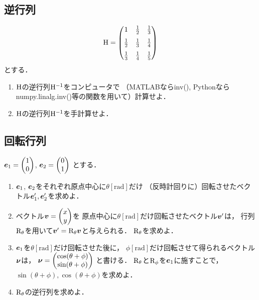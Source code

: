 \subsection{逆行列}
    \begin{equation}
      \mathrm{H} =
        \begin{pmatrix}
                     1 & \frac{1}{2} & \frac{1}{3} \\[1.5ex]
           \frac{1}{2} & \frac{1}{3} & \frac{1}{4} \\[1.5ex]
           \frac{1}{3} & \frac{1}{4} & \frac{1}{5}
        \end{pmatrix}
    \end{equation}
    とする．
    \begin{enumerate}[label=(\roman*)]
      \item $\mathrm{H}$の逆行列$\mathrm{H}^{-1}$をコンピュータで
        （MATLABならinv(), Pythonならnumpy.linalg.inv()等の関数を用いて）計算せよ．
        
      \item $\mathrm{H}$の逆行列$\mathrm{H}^{-1}$を手計算せよ．
    \end{enumerate}

\subsection{回転行列}
  $\boldsymbol{e}_1 = \begin{pmatrix} 1 \\ 0 \end{pmatrix}$,
  $\boldsymbol{e}_2 = \begin{pmatrix} 0 \\ 1 \end{pmatrix}$
  とする．
  \begin{enumerate}[label=(\roman*)]
    \item $\boldsymbol{e}_1$, $\boldsymbol{e}_2$をそれぞれ原点中心に$\theta \mathrm{[rad]}$だけ
      （反時計回りに）回転させたベクトル$\boldsymbol{e}'_1, \boldsymbol{e}'_2$を求めよ．
    \item ベクトル$\boldsymbol{v} = \begin{pmatrix} x \\ y \end{pmatrix}$を
      原点中心に$\theta \mathrm{[rad]}$だけ回転させたベクトル$\boldsymbol{v}'$は，
      行列$\mathrm{R}_\theta$を用いて$\boldsymbol{v}' = \mathrm{R}_\theta \boldsymbol{v}$と与えられる．
      $\mathrm{R}_\theta$を求めよ．
    \item $\boldsymbol{e}_1$を$\theta \mathrm{[rad]}$だけ回転させた後に，
      $\phi \mathrm{[rad]}$だけ回転させて得られるベクトル$\boldsymbol{\nu}$は，
      $\boldsymbol{\nu} = \begin{pmatrix} \cos(\theta + \phi) \\ \sin(\theta + \phi) \end{pmatrix}$
      と書ける．
      $\mathrm{R}_\theta$と$\mathrm{R}_\phi$を$\boldsymbol{e}_1$に施すことで，
      $\sin(\theta + \phi), \cos(\theta + \phi)$を求めよ．
    \item $\mathrm{R}_\theta$の逆行列を求めよ．
  \end{enumerate}

